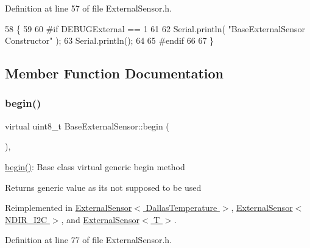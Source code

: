 Definition at line 57 of file External\+Sensor.\+h.


\begin{DoxyCode}
58     \{
59 
60 \textcolor{preprocessor}{    #if DEBUGExternal == 1 }
61 
62         Serial.println( \textcolor{stringliteral}{"BaseExternalSensor Constructor"} );
63         Serial.println();
64     
65 \textcolor{preprocessor}{    #endif}
66 
67     \}
\end{DoxyCode}


\subsection{Member Function Documentation}
\mbox{\label{class_base_external_sensor_a87d132803d4f4fdd4e66332809f0c9a0}} 
\subsubsection{\texorpdfstring{begin()}{begin()}}
{\footnotesize\ttfamily virtual uint8\+\_\+t Base\+External\+Sensor\+::begin (\begin{DoxyParamCaption}{ }\end{DoxyParamCaption})\hspace{0.3cm}{\ttfamily [inline]}, {\ttfamily [virtual]}}

\hyperlink{class_base_external_sensor_a87d132803d4f4fdd4e66332809f0c9a0}{begin()}\+: Base class virtual generic begin method

\begin{DoxyReturn}{Returns}
generic value as it\textquotesingle{}s not supposed to be used 
\end{DoxyReturn}


Reimplemented in \hyperlink{class_external_sensor_3_01_dallas_temperature_01_4_ac5275129b05e2ff8df45d5b222a661d9}{External\+Sensor$<$ Dallas\+Temperature $>$}, \hyperlink{class_external_sensor_3_01_n_d_i_r___i2_c_01_4_ac6f3614d94968ef0cc11b2b4d69cef03}{External\+Sensor$<$ N\+D\+I\+R\+\_\+\+I2\+C $>$}, and \hyperlink{class_external_sensor_ab6fe1379d55b656a048e0fba1e0a32e6}{External\+Sensor$<$ T $>$}.



Definition at line 77 of file External\+Sensor.\+h.


